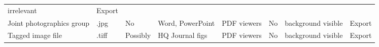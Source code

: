 \documentclass[]{article}
\begin{document}
\begin{longtable}[]{@{}llllllll@{}}
\begin{minipage}[t]{0.11\columnwidth}
irrelevant\strut
\end{minipage} & \begin{minipage}[t]{0.09\columnwidth}\raggedright\strut
Export\strut
\end{minipage}\tabularnewline
\begin{minipage}[t]{0.16\columnwidth}\raggedright\strut
Joint photographics group\strut
\end{minipage} & \begin{minipage}[t]{0.06\columnwidth}\raggedright\strut
.jpg\strut
\end{minipage} & \begin{minipage}[t]{0.07\columnwidth}\raggedright\strut
No\strut
\end{minipage} & \begin{minipage}[t]{0.10\columnwidth}\raggedright\strut
Word, PowerPoint\strut
\end{minipage} & \begin{minipage}[t]{0.10\columnwidth}\raggedright\strut
PDF viewers\strut
\end{minipage} & \begin{minipage}[t]{0.10\columnwidth}\raggedright\strut
No\strut
\end{minipage} & \begin{minipage}[t]{0.11\columnwidth}\raggedright\strut
background visible\strut
\end{minipage} & \begin{minipage}[t]{0.09\columnwidth}\raggedright\strut
Export\strut
\end{minipage}\tabularnewline
\begin{minipage}[t]{0.16\columnwidth}\raggedright\strut
Tagged image file\strut
\end{minipage} & \begin{minipage}[t]{0.06\columnwidth}\raggedright\strut
.tiff\strut
\end{minipage} & \begin{minipage}[t]{0.07\columnwidth}\raggedright\strut
Possibly\strut
\end{minipage} & \begin{minipage}[t]{0.10\columnwidth}\raggedright\strut
HQ Journal figs\strut
\end{minipage} & \begin{minipage}[t]{0.10\columnwidth}\raggedright\strut
PDF viewers\strut
\end{minipage} & \begin{minipage}[t]{0.10\columnwidth}\raggedright\strut
No\strut
\end{minipage} & \begin{minipage}[t]{0.11\columnwidth}\raggedright\strut
background visible\strut
\end{minipage} & \begin{minipage}[t]{0.09\columnwidth}\raggedright\strut
Export\strut
\end{minipage}\tabularnewline
\bottomrule
\end{longtable}
\end{document}
